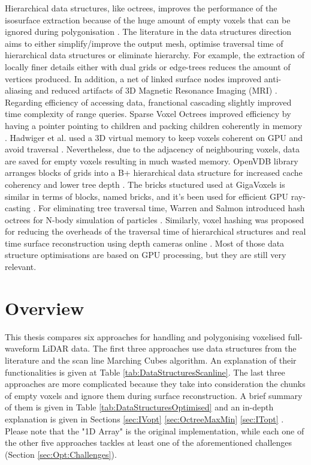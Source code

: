 \documentclass{subfiles}
\begin{document}
\par Hierarchical data structures, like octrees, improves the performance of the isosurface extraction because of the huge amount of empty voxels that can be ignored during polygonisation \cite{Wilhelms1990}. The literature in the data structures direction aims to either simplify/improve the output mesh, optimise traversal time of hierarchical data structures or eliminate hierarchy. For example, the extraction of locally finer details either with dual grids \cite{Scott2005} or edge-trees \cite{Wilhelms1992} reduces the amount of vertices produced. In addition, a net of linked surface nodes improved anti-aliasing and reduced artifacts of 3D Magnetic Resonance Imaging {\color{red}(MRI)} \cite{Gibson1998}. Regarding efficiency of accessing data,  franctional cascading slightly improved time complexity of range queries\cite{Chazelle1986}. Sparse Voxel Octrees improved efficiency by having a pointer pointing to children and packing children coherently in memory \cite{Laine2011SparseOctrees}. Hadwiger et al. used a 3D virtual memory to keep voxels coherent on GPU and avoid traversal \cite{Hadwiger2012}. Nevertheless, due to the adjacency of neighbouring voxels, data are saved for empty voxels resulting in much wasted memory. OpenVDB library arranges blocks of grids into a B+ hierarchical data structure for increased cache coherency and lower tree depth \cite{Museth2013OpenVDB}. The bricks stuctured used at GigaVoxels is similar in terms of blocks, named bricks, and it's been used for efficient GPU ray-casting \cite{Crassin2009}. For eliminating tree traversal time, Warren and Salmon introduced hash octrees for N-body simulation of particles \cite{Warren1993hashedOctree}. Similarly, voxel hashing was proposed for reducing the overheads of the traversal time of hierarchical structures and real time surface reconstruction using depth cameras online \cite{Nievner2016voxelHashing}. Most of those data structure optimisations are based on GPU processing, but they are still very relevant.


\section{Overview}



\par This thesis compares six approaches for handling and polygonising voxelised full-waveform LiDAR data. The first three approaches use data structures from the literature and the scan line Marching Cubes algorithm. An explanation of their functionalities is given at Table \ref{tab:DataStructuresScanline}. The last three approaches are more complicated because they take into consideration the chunks of empty voxels and ignore them during surface reconstruction. A brief summary of them is given in Table \ref{tab:DataStructuresOptimised} and an in-depth explanation is given in Sections \ref{sec:IVopt} \ref{sec:OctreeMaxMin} \ref{sec:ITopt} . Please note that the "1D Array" is the original implementation, while each one of the other five approaches tackles at least one of the aforementioned challenges (Section \ref{sec:Opt:Challenges}). 
\end{document}

